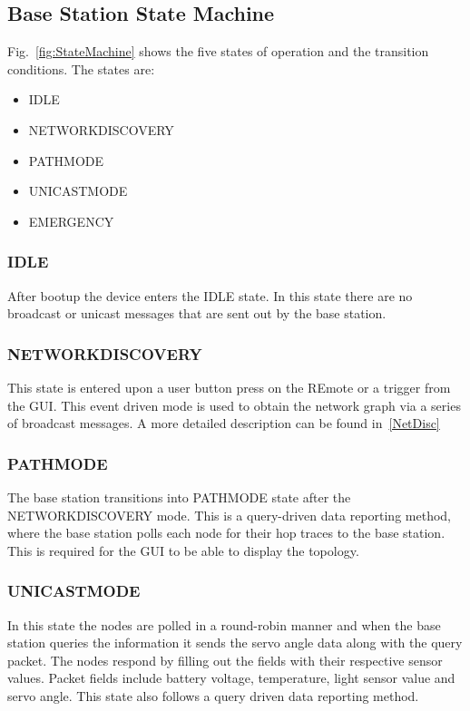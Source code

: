 \documentclass[conference]{IEEEtran}
\begin{document}
\subsection{Base Station State Machine}
Fig.~\ref{fig:StateMachine} shows the five states of operation and the transition conditions. The states are:
\begin{itemize}
    \item IDLE
    \item NETWORKDISCOVERY
    \item PATHMODE
    \item UNICASTMODE
    \item EMERGENCY
\end{itemize}

\subsubsection{IDLE} \label{IDLEMODE}
After bootup the device enters the IDLE state. In this state there are no broadcast or unicast messages that are sent out by the base station.

\subsubsection{NETWORKDISCOVERY} \label{NetDiscMode}
This state is entered upon a user button press on the REmote or a trigger from the GUI. This event driven mode is used to obtain the network graph via a series of broadcast messages. A more detailed description can be found in~\ref{NetDisc}

\subsubsection{PATHMODE} \label{PathMode}
The base station transitions into PATHMODE state after the NETWORKDISCOVERY mode. This is a query-driven data reporting method, where the base station polls each node for their hop traces to the base station. This is required for the GUI to be able to display the topology.

\subsubsection{UNICASTMODE} \label{UNICASTMODE}
In this state the nodes are polled in a round-robin manner and when the base station queries the information it sends the servo angle data along with the query packet. The nodes respond by filling out the fields with their respective sensor values. Packet fields include battery voltage, temperature, light sensor value and servo angle. This state also follows a query driven data reporting method.
\end{document}
